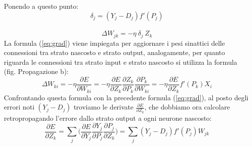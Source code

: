 \documentclass[10pt,a4paper]{article}
\begin{document}
Ponendo a questo punto:
\begin{equation} \label{eq:cr}
\delta_j = (Y_j - D_j)f'(P_j) 
\end{equation}
\\
\begin{equation} \label{eq:gradcr}
\Delta W_{jk} = -\eta \ \delta_j \ Z_k
\end{equation}
La formula (\ref{eq:grad}) viene impiegata per aggiornare i pesi sinattici delle connessioni tra strato nascosto e strato output, analogamente, per quanto riguarda le connessioni tra strato input e strato nascosto si utilizza la formula (fig. Propagazione b):
\begin{equation} \label{eq:dih}
\Delta W_{ki} = -\eta \frac{\partial E}{\partial W_{ki}} = - \eta \frac{\partial E}{\partial Z_k} \frac{\partial Z_k}{\partial P_k} \frac{\partial P_k}{\partial W_{ki}} = -\eta \frac{\partial E}{\partial Z_k}f'(P_k)X_i
\end{equation}
Confrontando questa formula con la precedente formula (\ref{eq:grad}), al posto degli errori noti $(Y_j - D_j)$ troviamo le derivate $\frac{\partial E}{\partial Z_k}$, che dobbiamo ora calcolare retropropagando l'errore dallo strato output a ogni neurone nascosto:
\begin{equation} 
\frac{\partial E}{\partial Z_k} = \sum_j \Bigg( \frac{\partial E}{\partial Y_j} \frac{\partial Y_j}{\partial P_j} \frac{\partial P_j}{\partial Z_k} \Bigg) = \sum_j (Y_j - D_j)f'(P_j)W_{jk} 
\end{equation}
\end{document}
